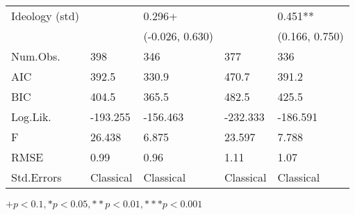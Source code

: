 \begin{table}[th!]
\begin{threeparttable}
\begin{tabular}{lC{2.7cm}C{2.7cm}C{2.7cm}C{2.7cm}}
 Ideology (std) &                  &                  0.296+ &                  &                  0.451** \\
                &                  &         (-0.026, 0.630) &                  &           (0.166, 0.750) \\
       Num.Obs. &              398 &                     346 &              377 &                      336 \\
            AIC &            392.5 &                   330.9 &            470.7 &                    391.2 \\
            BIC &            404.5 &                   365.5 &            482.5 &                    425.5 \\
       Log.Lik. &         -193.255 &                -156.463 &         -232.333 &                 -186.591 \\
              F &           26.438 &                   6.875 &           23.597 &                    7.788 \\
           RMSE &             0.99 &                    0.96 &             1.11 &                     1.07 \\
     Std.Errors &        Classical &               Classical &        Classical &                Classical \\
\bottomrule
\end{tabular}
\begin{tablenotes}
\item \footnotesize $+ p < 0.1, * p < 0.05, ** p < 0.01, *** p < 0.001$
\end{tablenotes}
\end{threeparttable}
\end{table}
